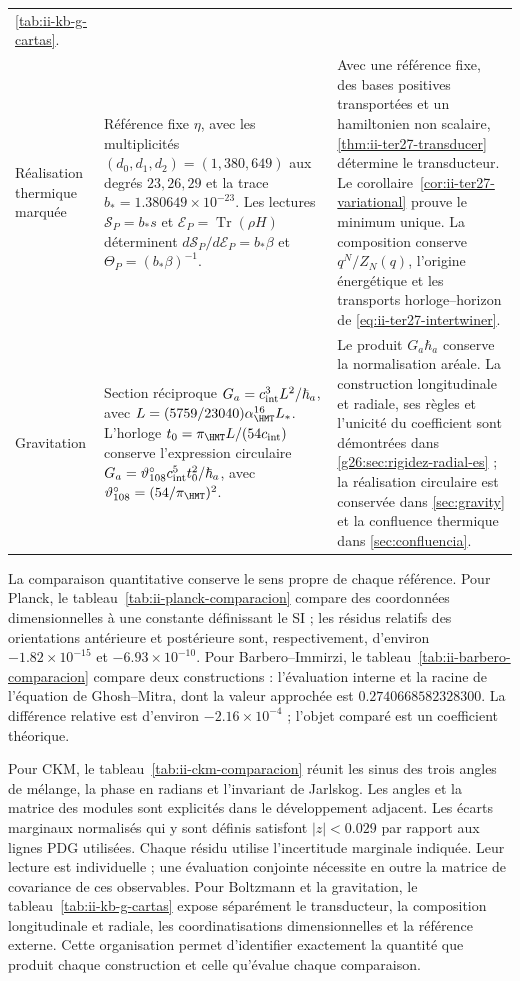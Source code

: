 \begin{longtable}{@{}p{.13\linewidth}p{.415\linewidth}p{.395\linewidth}@{}}
\ref{tab:ii-kb-g-cartas}.\\[5pt]
Réalisation thermique marquée & Référence fixe $\eta$, avec les multiplicités
$(d_0,d_1,d_2)=(1,380,649)$ aux degrés $23,26,29$ et la trace
$b_*=1.380649\times10^{-23}$.
Les lectures $\mathcal S_P=b_*s$ et $\mathcal E_P=\operatorname{Tr}(\rho H)$
déterminent $d\mathcal S_P/d\mathcal E_P=b_*\beta$ et
$\Theta_P=(b_*\beta)^{-1}$.
& Avec une référence fixe, des bases positives transportées et un hamiltonien non
scalaire, \ref{thm:ii-ter27-transducer} détermine le transducteur.
Le corollaire~\ref{cor:ii-ter27-variational} prouve le minimum unique.
La composition conserve $q^N/Z_N(q)$, l’origine énergétique et les
transports horloge--horizon de \eqref{eq:ii-ter27-intertwiner}.\\[5pt]
Gravitation & Section réciproque
$G_a=c_{\rm int}^{3}L^2/\hbar_a$,
avec $L=(5759/23040)\alpha_{\HMT}^{16}L_*$.
L’horloge $t_0=\pi_{\HMT}L/(54c_{\rm int})$ conserve l’expression
circulaire $G_a=\vartheta_{108}^{\circ}c_{\rm int}^{5}t_0^2/\hbar_a$,
avec $\vartheta_{108}^{\circ}=(54/\pi_{\HMT})^2$.
& Le produit $G_a\hbar_a$ conserve la normalisation aréale.
La construction longitudinale et radiale, ses règles et l’unicité du
coefficient sont démontrées dans \ref{g26:sec:rigidez-radial-es} ;
la réalisation circulaire est conservée dans \ref{sec:gravity} et la confluence thermique dans
\ref{sec:confluencia}.\\
\end{longtable}
\endgroup

La comparaison quantitative conserve le sens propre de chaque
référence. Pour Planck, le tableau~\ref{tab:ii-planck-comparacion} compare
des coordonnées dimensionnelles à une constante définissant le SI ; les
résidus relatifs des orientations antérieure et postérieure sont,
respectivement, d’environ $-1.82\times10^{-15}$ et
$-6.93\times10^{-10}$. Pour Barbero--Immirzi, le
tableau~\ref{tab:ii-barbero-comparacion} compare deux constructions :
l’évaluation interne et la racine de l’équation de Ghosh--Mitra, dont la
valeur approchée est $0.2740668582328300$. La différence relative est
d’environ $-2.16\times10^{-4}$ ; l’objet comparé est un
coefficient théorique.

Pour CKM, le tableau~\ref{tab:ii-ckm-comparacion} réunit les sinus des
trois angles de mélange, la phase en radians et l’invariant de Jarlskog.
Les angles et la matrice des modules sont explicités dans le développement
adjacent.
Les écarts marginaux normalisés qui y sont définis satisfont
$|z|<0.029$ par rapport aux lignes PDG utilisées. Chaque résidu utilise
l’incertitude marginale indiquée. Leur lecture est individuelle ;
une évaluation conjointe nécessite en outre la matrice de covariance
de ces observables.
Pour Boltzmann et la gravitation, le tableau~\ref{tab:ii-kb-g-cartas}
expose séparément le transducteur, la composition longitudinale et radiale, les coordinatisations dimensionnelles
et la référence externe. Cette organisation permet
d’identifier exactement la quantité que produit chaque construction et
celle qu’évalue chaque comparaison.

